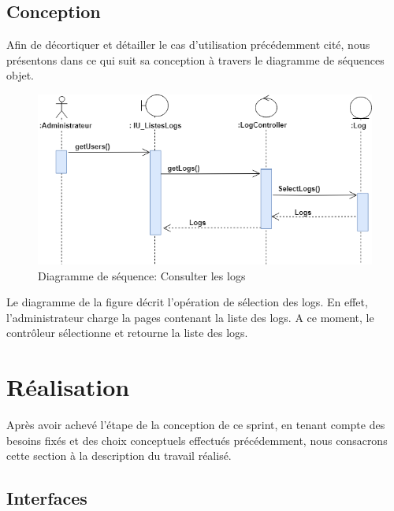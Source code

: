 \subsection{Conception}
Afin de décortiquer et détailler le cas d'utilisation précédemment cité, nous présentons dans ce qui suit sa conception à travers le diagramme de séquences objet.
\newline
\begin{figure}[H]
	\centering
	\includegraphics[scale=0.6]{listerLog.png}
	\caption{Diagramme de séquence: Consulter les logs}
	\label{Diagramme de séquence: Consulter les logs}
\end{figure}

Le diagramme de la figure décrit l'opération de sélection des logs. En effet, l'administrateur charge la pages contenant la  liste des logs. A ce moment, le contrôleur sélectionne  et retourne la liste des logs.
\section{Réalisation}
Après avoir achevé l'étape de la conception de ce sprint, en tenant compte des besoins fixés et des
choix conceptuels effectués  précédemment, nous consacrons cette section à la
description du travail réalisé.
\subsection{Interfaces}

